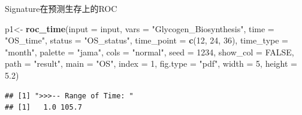 \documentclass[
  12pt,
]{book}
\newenvironment{Shaded}{\begin{snugshade}}{\end{snugshade}}
\newcommand{\AttributeTok}[1]{\textcolor[rgb]{0.13,0.29,0.53}{#1}}
\newcommand{\ConstantTok}[1]{\textcolor[rgb]{0.56,0.35,0.01}{#1}}
\newcommand{\DecValTok}[1]{\textcolor[rgb]{0.00,0.00,0.81}{#1}}
\newcommand{\FloatTok}[1]{\textcolor[rgb]{0.00,0.00,0.81}{#1}}
\newcommand{\FunctionTok}[1]{\textcolor[rgb]{0.13,0.29,0.53}{\textbf{#1}}}
\newcommand{\NormalTok}[1]{#1}
\newcommand{\OtherTok}[1]{\textcolor[rgb]{0.56,0.35,0.01}{#1}}
\newcommand{\StringTok}[1]{\textcolor[rgb]{0.31,0.60,0.02}{#1}}
\theoremstyle{definition}
\theoremstyle{definition}
\theoremstyle{definition}
\theoremstyle{definition}
\theoremstyle{remark}
\begin{document}
Signature在预测生存上的ROC

\begin{Shaded}
\begin{Highlighting}[]
\NormalTok{p1}\OtherTok{\textless{}{-}} \FunctionTok{roc\_time}\NormalTok{(}\AttributeTok{input      =}\NormalTok{ input,  }
             \AttributeTok{vars       =} \StringTok{"Glycogen\_Biosynthesis"}\NormalTok{, }
             \AttributeTok{time       =} \StringTok{"OS\_time"}\NormalTok{,}
             \AttributeTok{status     =} \StringTok{"OS\_status"}\NormalTok{, }
             \AttributeTok{time\_point =} \FunctionTok{c}\NormalTok{(}\DecValTok{12}\NormalTok{, }\DecValTok{24}\NormalTok{, }\DecValTok{36}\NormalTok{), }
             \AttributeTok{time\_type  =} \StringTok{"month"}\NormalTok{,}
             \AttributeTok{palette    =} \StringTok{"jama"}\NormalTok{,}
             \AttributeTok{cols       =} \StringTok{"normal"}\NormalTok{,}
             \AttributeTok{seed       =} \DecValTok{1234}\NormalTok{, }
             \AttributeTok{show\_col   =} \ConstantTok{FALSE}\NormalTok{, }
             \AttributeTok{path       =} \StringTok{"result"}\NormalTok{, }
             \AttributeTok{main       =} \StringTok{"OS"}\NormalTok{,}
             \AttributeTok{index      =} \DecValTok{1}\NormalTok{,}
             \AttributeTok{fig.type   =} \StringTok{"pdf"}\NormalTok{,}
             \AttributeTok{width      =} \DecValTok{5}\NormalTok{,}
             \AttributeTok{height     =} \FloatTok{5.2}\NormalTok{)}
\end{Highlighting}
\end{Shaded}

\begin{verbatim}
## [1] ">>>-- Range of Time: "
## [1]   1.0 105.7
\end{verbatim}
\end{document}
